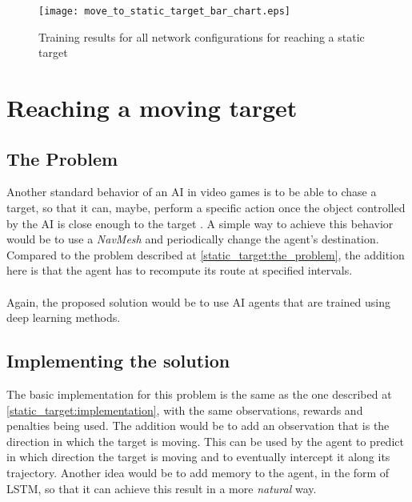 \begin{figure}
    \begin{center}
        \texttt{[image: move\_to\_static\_target\_bar\_chart.eps]}
        \caption{Training results for all network configurations for reaching a static target}
        \label{train_results_static_bar_chart}
    \end{center}
\end{figure}






\section{Reaching a moving target}


\subsection{The Problem} \label{moving_target:the_problem}
Another standard behavior of an AI in video games is to be able to chase a target, so that it can, maybe, perform a specific action once the object controlled by the AI is close enough to the target . A simple way to achieve this behavior would be to use a \emph{NavMesh} and periodically change the agent's destination. Compared to the problem described at \ref{static_target:the_problem}, the addition here is that the agent has to recompute its route at specified intervals.

\paragraph{}
Again, the proposed solution would be to use AI agents that are trained using deep learning methods.

\subsection{Implementing the solution} \label{moving_target:implementation}
The basic implementation for this problem is the same as the one described at \ref{static_target:implementation}, with the same observations, rewards and penalties being used. The addition would be to add an observation that is the direction in which the target is moving. This can be used by the agent to predict in which direction the target is moving and to eventually intercept it along its trajectory. Another idea would be to add memory to the agent, in the form of LSTM, so that it can achieve this result in a more \emph{natural} way.


